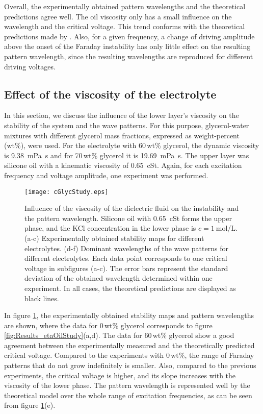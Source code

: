 \documentclass{jfm_arxiv}
\begin{document}
Overall, the experimentally obtained pattern wavelengths and the theoretical predictions agree well. The oil viscosity only has a small influence on the wavelength and the critical voltage. This trend conforms with the theoretical predictions made by \citet{Bandopadhyay2017}.
Also, for a given frequency, a change of driving amplitude above the onset of the Faraday instability has only little effect on the resulting pattern wavelength, since the resulting wavelengths are reproduced for different driving voltages.

\subsection{Effect of the viscosity of the electrolyte}

In this section, we discuss the influence of the lower layer's viscosity on the stability of the system and the wave patterns. For this purpose, glycerol-water mixtures with different glycerol mass fractions, expressed as weight-percent (wt\%), were used. For the electrolyte with \mbox{60\,wt\%} glycerol, the dynamic viscosity is \SI{9.38}{\milli\pascal\second} and for \mbox{70\,wt\%} glycerol it is \SI{19.69}{\milli\pascal\second}.
The upper layer was silicone oil with a kinematic viscosity of \SI{0.65}{\centi St}.
Again, for each excitation frequency and voltage amplitude, one experiment was performed.

\begin{figure}
  \centerline{\texttt{[image: cGlycStudy.eps]}}%
  \caption{Influence of the viscosity of the dielectric fluid on the instability and the pattern wavelength. Silicone oil with \SI{0.65}{\centi St} forms the upper phase, and the KCl concentration in the lower phase is $c=\SI{1}{\mol \per \liter}$. 
  (a-c) Experimentally obtained stability maps for different electrolytes. 
  (d-f) Dominant wavelengths of the wave patterns for different electrolytes. Each data point corresponds to one critical voltage in subfigures (a-c). The error bars represent the standard deviation of the obtained wavelength determined within one experiment.
  In all cases, the theoretical predictions are displayed as black lines.}
\label{fig:Results_cGlycStudy}
\end{figure}

In figure \ref{fig:Results_cGlycStudy}, the experimentally obtained stability maps and pattern wavelengths are shown, where the data for \mbox{0\,wt\%} glycerol corresponds to figure \ref{fig:Results_etaOilStudy}(a,d).
The data for \mbox{60\,wt\%} glycerol show a good agreement between the experimentally measured and the theoretically predicted critical voltage. 
Compared to the experiments with \mbox{0\,wt\%}, the range of Faraday patterns that do not grow indefinitely is smaller.
Also, compared to the previous experiments, the critical voltage is higher, and its slope increases with the viscosity of the lower phase.
The pattern wavelength is represented well by the theoretical model over the whole range of excitation frequencies, as can be seen from figure \ref{fig:Results_cGlycStudy}(e). 
\end{document}
